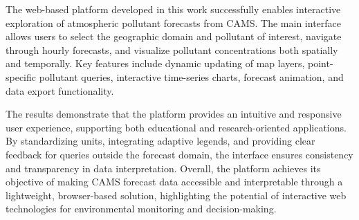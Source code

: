 The web-based platform developed in this work successfully enables interactive exploration of atmospheric pollutant forecasts from CAMS. The main interface allows users to select the geographic domain and pollutant of interest, navigate through hourly forecasts, and visualize pollutant concentrations both spatially and temporally. Key features include dynamic updating of map layers, point-specific pollutant queries, interactive time-series charts, forecast animation, and data export functionality. 

The results demonstrate that the platform provides an intuitive and responsive user experience, supporting both educational and research-oriented applications. By standardizing units, integrating adaptive legends, and providing clear feedback for queries outside the forecast domain, the interface ensures consistency and transparency in data interpretation. Overall, the platform achieves its objective of making CAMS forecast data accessible and interpretable through a lightweight, browser-based solution, highlighting the potential of interactive web technologies for environmental monitoring and decision-making.

